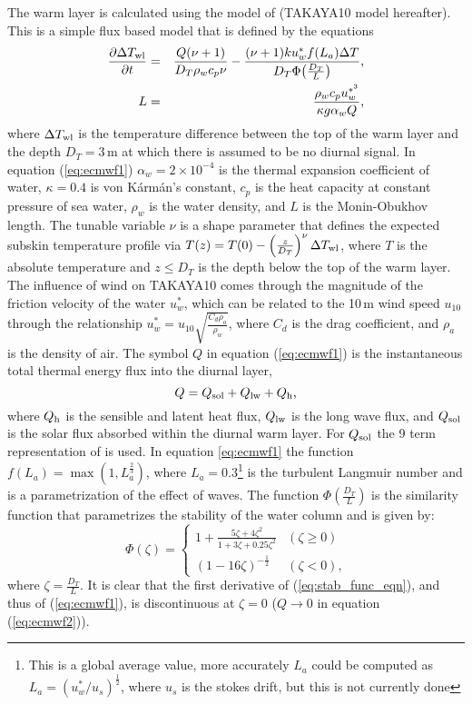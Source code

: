 \documentclass[../main/NEMO_manual]{subfiles}
\begin{document}
The warm layer is calculated using the model of \citet{Takaya_al_JGR10} (TAKAYA10 model hereafter).
This is a simple flux based model that is defined by the equations
\begin{align}
\frac{\partial{\Delta T_{\rm{wl}}}}{\partial{t}}&=&\frac{Q(\nu+1)}{D_T\rho_w c_p
\nu}-\frac{(\nu+1)ku^*_{w}f(L_a)\Delta T}{D_T\Phi\!\left(\frac{D_T}{L}\right)} \mbox{,}
\label{eq:ecmwf1} \\
L&=&\frac{\rho_w c_p u^{*^3}_{w}}{\kappa g \alpha_w Q }\mbox{,}\label{eq:ecmwf2}
\end{align}
where $\Delta T_{\rm{wl}}$ is the temperature difference between the top of the warm layer and the depth $D_T=3$\,m at which there is assumed to be no diurnal signal.
In equation (\autoref{eq:ecmwf1}) $\alpha_w=2\times10^{-4}$ is the thermal expansion coefficient of water,
$\kappa=0.4$ is von K\'{a}rm\'{a}n's constant, $c_p$ is the heat capacity at constant pressure of sea water,
$\rho_w$ is the water density, and $L$ is the Monin-Obukhov length.
The tunable variable $\nu$ is a shape parameter that defines the expected subskin temperature profile via
$T(z) = T(0) - \left( \frac{z}{D_T} \right)^\nu \Delta T_{\rm{wl}}$,
where $T$ is the absolute temperature and $z\le D_T$ is the depth below the top of the warm layer.
The influence of wind on TAKAYA10 comes through the magnitude of the friction velocity of the water $u^*_{w}$,
which can be related to the 10\,m wind speed $u_{10}$ through
the relationship $u^*_{w} = u_{10}\sqrt{\frac{C_d\rho_a}{\rho_w}}$, where $C_d$ is the drag coefficient,
and $\rho_a$ is the density of air.
The symbol $Q$ in equation (\autoref{eq:ecmwf1}) is the instantaneous total thermal energy flux into
the diurnal layer, \ie
\[
  Q = Q_{\rm{sol}} + Q_{\rm{lw}} + Q_{\rm{h}}\mbox{,}
\]
where $Q_{\rm{h}}$ is the sensible and latent heat flux, $Q_{\rm{lw}}$ is the long wave flux,
and $Q_{\rm{sol}}$ is the solar flux absorbed within the diurnal warm layer.
For $Q_{\rm{sol}}$ the 9 term representation of \citet{Gentemann_al_JGR09} is used.
In equation \autoref{eq:ecmwf1} the function $f(L_a)=\max(1,L_a^{\frac{2}{3}})$,
where $L_a=0.3$\footnote{
  This is a global average value, more accurately $L_a$ could be computed as $L_a=(u^*_{w}/u_s)^{\frac{1}{2}}$,
  where $u_s$ is the stokes drift, but this is not currently done
} is the turbulent Langmuir number and is a parametrization of the effect of waves.
The function $\Phi\!\left(\frac{D_T}{L}\right)$ is the similarity function that
parametrizes the stability of the water column and is given by:
\begin{equation}
\Phi(\zeta) = \left\{ \begin{array}{cc} 1 + \frac{5\zeta +
4\zeta^2}{1+3\zeta+0.25\zeta^2} &(\zeta \ge 0) \\
                                    (1 - 16\zeta)^{-\frac{1}{2}} & (\zeta < 0) \mbox{,}
                                    \end{array} \right. \label{eq:stab_func_eqn}
\end{equation}
where $\zeta=\frac{D_T}{L}$.  It is clear that the first derivative of (\autoref{eq:stab_func_eqn}),
and thus of (\autoref{eq:ecmwf1}), is discontinuous at $\zeta=0$ (\ie $Q\rightarrow0$ in
equation (\autoref{eq:ecmwf2})).
\end{document}
